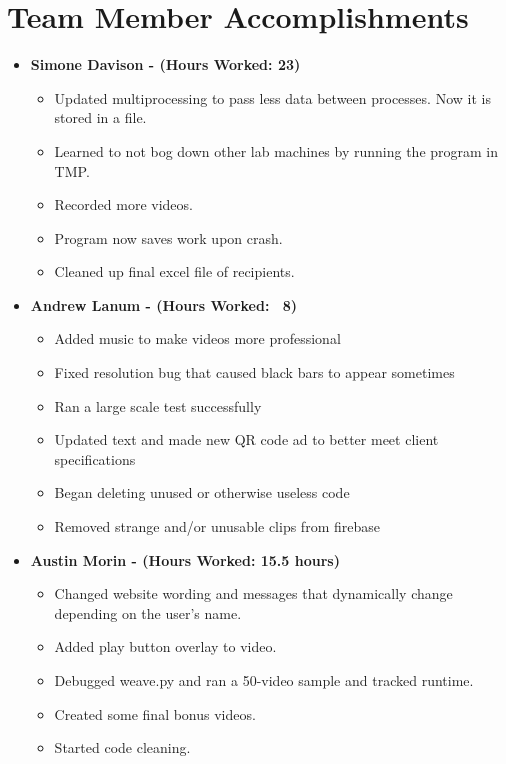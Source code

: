 \documentclass{article}
\begin{document}
\section{Team Member Accomplishments}
\begin{itemize}
    \item  \bf{Simone Davison - (Hours Worked: 23)}
    \begin{itemize}
        \item Updated multiprocessing to pass less data between processes. Now it is stored in a file.
        \item Learned to not bog down other lab machines by running the program in TMP.
        \item Recorded more videos.
        \item Program now saves work upon crash.
        \item Cleaned up final excel file of recipients.
    \end{itemize}
    
    \item  \bf{Andrew Lanum - (Hours Worked: ~8)}
		\begin{itemize}
			\item Added music to make videos more professional
			\item Fixed resolution bug that caused black bars to appear sometimes
			\item Ran a large scale test successfully
			\item Updated text and made new QR code ad to better meet client specifications
			\item Began deleting unused or otherwise useless code
			\item Removed strange and/or unusable clips from firebase
		\end{itemize}
		
    \item  \bf{Austin Morin - (Hours Worked: 15.5 hours)}
    \begin{itemize}
        \item Changed website wording and messages that dynamically change depending on the user's name.
        \item Added play button overlay to video.
        \item Debugged weave.py and ran a 50-video sample and tracked runtime.
        \item Created some final bonus videos.
        \item Started code cleaning.
    \end{itemize}
\end{itemize}
\end{document}
